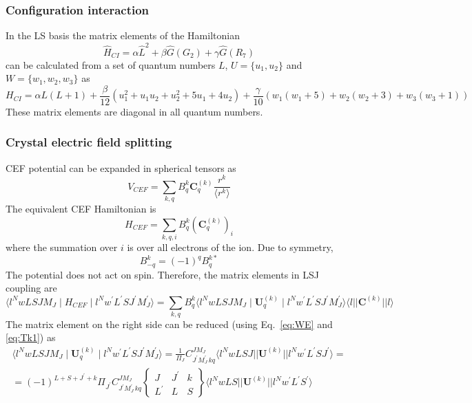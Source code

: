 \documentclass[a4paper,oneside,12pt]{extarticle}
\begin{document}
\subsubsection {Configuration interaction}
\label{ssec:CI}
%
In the LS basis the matrix elements of the Hamiltonian
$$
\hat{H}_{CI} = \alpha \hat{L}^2 + \beta \hat{G} (G_2) + \gamma \hat{G} (R_7)
$$
can be calculated from a set of quantum numbers $L$, $U=\{u_1,u_2\}$ and $W=\{w_1,w_2,w_3\}$ as \cite{Gerken_1983}
$$
H_{CI} = \alpha L(L+1) + \frac{\beta}{12} (u_1^2 + u_1 u_2 + u_2^2 + 5u_1 + 4 u_2) + 
\frac{\gamma}{10} (w_1(w_1+5) + w_2(w_2+3) + w_3(w_3+1))
$$
%
These matrix elements are diagonal in all quantum numbers.
%
\subsubsection {Crystal electric field splitting}
\label{ssec:CEF}
%
CEF potential can be expanded in spherical tensors as
%
$$
V_{CEF} = \sum_{k,q} B_q^k \mathbf{C}_q^{(k)} \frac{r^k}{\langle r^k \rangle}
$$
The equivalent CEF Hamiltonian is
$$
H_{CEF} = \sum_{k,q,i} B_q^k (\mathbf{C}_q^{(k)})_i
$$
where the summation over $i$ is over all electrons of the ion. Due to symmetry,
$$
B_{-q}^k = (-1)^q B_q^{k*}
$$
The potential does not act on spin. Therefore, the matrix elements in LSJ coupling are
%
$$
\langle l^N wLSJM_J \mid H_{CEF} \mid l^N w^{\prime}L^{\prime}SJ^{\prime}M_J^{\prime} \rangle =
\sum_{k,q} B_q^k \langle l^N wLSJM_J \mid \mathbf{U}_q^{(k)} \mid l^N w^{\prime}L^{\prime}SJ^{\prime}M_J^{\prime} \rangle
\langle l || \mathbf{C}^{(k)} || l \rangle
$$
%
The matrix element on the right side can be reduced (using Eq.~\ref{eq:WE} and \ref{eq:Tk1}) as
%
\begin{multline}
\langle l^N wLSJM_J \mid \mathbf{U}_q^{(k)} \mid l^N w^{\prime}L^{\prime}SJ^{\prime}M_J^{\prime} \rangle =
\frac{1}{\Pi_{J}}
C_{J^{\prime} M_J^{\prime} \, k q}^{J M_J}
\langle l^N wLSJ || \mathbf{U}^{(k)} || l^N w^{\prime}L^{\prime}SJ^{\prime} \rangle = \\ =
(-1)^{L + S + J^{\prime} + k} \Pi_{J^{\prime}} C_{J^{\prime} M_J^{\prime} \, k q}^{J M_J}
\left \{
\begin{array}{ccc}
J & J^{\prime} & k \\
L^{\prime} & L & S
\end{array}
\right \}
\langle l^N wLS || \mathbf{U}^{(k)} || l^N w^{\prime}L^{\prime}S^{\prime} \rangle
\end{multline}
\end{document}

